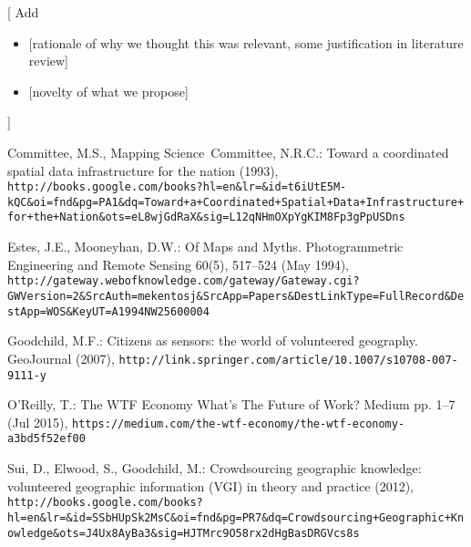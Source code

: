 \documentclass{llncs}
\begin{document}
{[}
Add
\begin{itemize}
	\item {[}rationale of why we thought this was relevant, some justification in literature review{]}
	\item {[}novelty of what we propose{]}
\end{itemize}
{]}



\begin{thebibliography}{1}
\providecommand{\url}[1]{\texttt{#1}}
\providecommand{\urlprefix}{URL }

Committee, M.S., Mapping Science~Committee, N.R.C.: {Toward a coordinated
  spatial data infrastructure for the nation} (1993),
  \url{http://books.google.com/books?hl=en&lr=&id=t6iUtE5M-kQC&oi=fnd&pg=PA1&dq=Toward+a+Coordinated+Spatial+Data+Infrastructure+for+the+Nation&ots=eL8wjGdRaX&sig=L12qNHmOXpYgKIM8Fp3gPpUSDns}

Estes, J.E., Mooneyhan, D.W.: {Of Maps and Myths}. Photogrammetric Engineering
  and Remote Sensing  60(5),  517--524 (May 1994),
  \url{http://gateway.webofknowledge.com/gateway/Gateway.cgi?GWVersion=2&SrcAuth=mekentosj&SrcApp=Papers&DestLinkType=FullRecord&DestApp=WOS&KeyUT=A1994NW25600004}

Goodchild, M.F.: {Citizens as sensors: the world of volunteered geography}.
  GeoJournal  (2007),
  \url{http://link.springer.com/article/10.1007/s10708-007-9111-y}

O'Reilly, T.: {The WTF Economy {\textemdash} What{\textquoteright}s The Future
  of Work? {\textemdash} Medium} pp. 1--7 (Jul 2015),
  \url{https://medium.com/the-wtf-economy/the-wtf-economy-a3bd5f52ef00}

Sui, D., Elwood, S., Goodchild, M.: {Crowdsourcing geographic knowledge:
  volunteered geographic information (VGI) in theory and practice} (2012),
  \url{http://books.google.com/books?hl=en&lr=&id=SSbHUpSk2MsC&oi=fnd&pg=PR7&dq=Crowdsourcing+Geographic+Knowledge&ots=J4Ux8AyBa3&sig=HJTMrc9O58rx2dHgBasDRGVcs8s}

\end{thebibliography}
\end{document}

